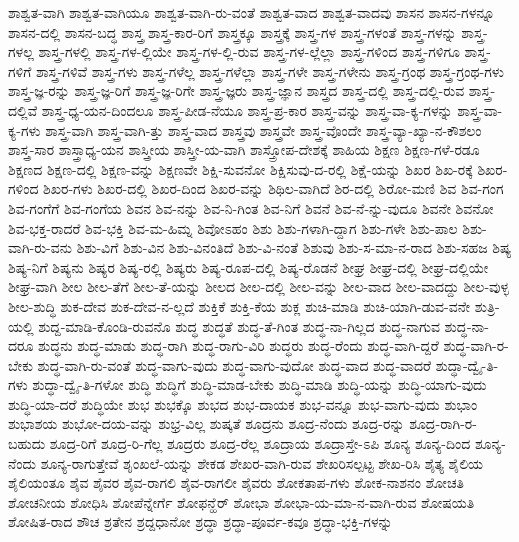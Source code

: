 {ಶಾಶ್ವತ-ವಾಗಿ
ಶಾಶ್ವತ-ವಾಗಿಯೂ
ಶಾಶ್ವತ-ವಾಗಿ-ರು-ವಂತೆ
ಶಾಶ್ವತ-ವಾದ
ಶಾಶ್ವತ-ವಾದವು
ಶಾಸನ
ಶಾಸನ-ಗಳನ್ನೂ
ಶಾಸನ-ದಲ್ಲಿ
ಶಾಸನ-ಬದ್ಧ
ಶಾಸ್ತ್ರ
ಶಾಸ್ತ್ರ-ಕಾರ-ರಿಗೆ
ಶಾಸ್ತ್ರಕ್ಕೂ
ಶಾಸ್ತ್ರಕ್ಕೆ
ಶಾಸ್ತ್ರ-ಗಳ
ಶಾಸ್ತ್ರ-ಗಳಂತೆ
ಶಾಸ್ತ್ರ-ಗಳನ್ನು
ಶಾಸ್ತ್ರ-ಗಳಲ್ಲ
ಶಾಸ್ತ್ರ-ಗಳಲ್ಲಿ
ಶಾಸ್ತ್ರ-ಗಳ-ಲ್ಲಿಯೇ
ಶಾಸ್ತ್ರ-ಗಳ-ಲ್ಲಿ-ರುವ
ಶಾಸ್ತ್ರ-ಗಳ-ಲ್ಲೆಲ್ಲಾ
ಶಾಸ್ತ್ರ-ಗಳಿಂದ
ಶಾಸ್ತ್ರ-ಗಳಿಗೂ
ಶಾಸ್ತ್ರ-ಗಳಿಗೆ
ಶಾಸ್ತ್ರ-ಗಳಿವೆ
ಶಾಸ್ತ್ರ-ಗಳು
ಶಾಸ್ತ್ರ-ಗಳೆಲ್ಲ
ಶಾಸ್ತ್ರ-ಗಳೆಲ್ಲಾ
ಶಾಸ್ತ್ರ-ಗಳೇ
ಶಾಸ್ತ್ರ-ಗಳೇನು
ಶಾಸ್ತ್ರ-ಗ್ರಂಥ
ಶಾಸ್ತ್ರ-ಗ್ರಂಥ-ಗಳು
ಶಾಸ್ತ್ರ-ಜ್ಞ-ರನ್ನು
ಶಾಸ್ತ್ರ-ಜ್ಞ-ರಿಗೆ
ಶಾಸ್ತ್ರ-ಜ್ಞ-ರಿಗೇ
ಶಾಸ್ತ್ರ-ಜ್ಞರು
ಶಾಸ್ತ್ರ-ಜ್ಞಾನ
ಶಾಸ್ತ್ರದ
ಶಾಸ್ತ್ರ-ದಲ್ಲಿ
ಶಾಸ್ತ್ರ-ದಲ್ಲಿ-ರುವ
ಶಾಸ್ತ್ರ-ದಲ್ಲಿವೆ
ಶಾಸ್ತ್ರ-ಧ್ಯ-ಯನ-ದಿಂದಲೂ
ಶಾಸ್ತ್ರ-ಪೀಡ-ನೆಯೂ
ಶಾಸ್ತ್ರ-ಪ್ರ-ಕಾರ
ಶಾಸ್ತ್ರ-ವನ್ನು
ಶಾಸ್ತ್ರ-ವಾ-ಕ್ಯ-ಗಳನ್ನು
ಶಾಸ್ತ್ರ-ವಾ-ಕ್ಯ-ಗಳು
ಶಾಸ್ತ್ರ-ವಾಗಿ
ಶಾಸ್ತ್ರ-ವಾಗಿ-ತ್ತು
ಶಾಸ್ತ್ರ-ವಾದ
ಶಾಸ್ತ್ರವು
ಶಾಸ್ತ್ರವೇ
ಶಾಸ್ತ್ರ-ವೊಂದೇ
ಶಾಸ್ತ್ರ-ವ್ಯಾ-ಖ್ಯಾ-ನ-ಕೌಶಲಂ
ಶಾಸ್ತ್ರ-ಸಾರ
ಶಾಸ್ತ್ರಾಧ್ಯ-ಯನ
ಶಾಸ್ತ್ರೀಯ
ಶಾಸ್ತ್ರೀ-ಯ-ವಾಗಿ
ಶಾಸ್ತ್ರೋಪ-ದೇಶಕ್ಕೆ
ಶಾಹಿಯ
ಶಿಕ್ಷಣ
ಶಿಕ್ಷಣ-ಗಳೆ-ರಡೂ
ಶಿಕ್ಷಣದ
ಶಿಕ್ಷಣ-ದಲ್ಲಿ
ಶಿಕ್ಷಣ-ವನ್ನು
ಶಿಕ್ಷಣವೇ
ಶಿಕ್ಷಿ-ಸುವನೋ
ಶಿಕ್ಷಿಸುವು-ದ-ರಲ್ಲಿ
ಶಿಕ್ಷೆ-ಯನ್ನು
ಶಿಖರ
ಶಿಖ-ರಕ್ಕೆ
ಶಿಖರ-ಗಳಿಂದ
ಶಿಖರ-ಗಳು
ಶಿಖರ-ದಲ್ಲಿ
ಶಿಖರ-ದಿಂದ
ಶಿಖರ-ವನ್ನು
ಶಿಥಿಲ-ವಾಗಿದೆ
ಶಿರ-ದಲ್ಲಿ
ಶಿರೋ-ಮಣಿ
ಶಿವ
ಶಿವ-ಗಂಗ
ಶಿವ-ಗಂಗೆಗೆ
ಶಿವ-ಗಂಗೆಯ
ಶಿವನ
ಶಿವ-ನನ್ನು
ಶಿವ-ನಿ-ಗಿಂತ
ಶಿವ-ನಿಗೆ
ಶಿವನೆ
ಶಿವ-ನೆ-ನ್ನು-ವುದೂ
ಶಿವನೇ
ಶಿವನೋ
ಶಿವ-ಭಕ್ತ-ರಾದರೆ
ಶಿವ-ಭಕ್ತಿ
ಶಿವ-ಮ-ಹಿಮ್ನ
ಶಿವೋಽಹಂ
ಶಿಶು
ಶಿಶು-ಗಳಾಗಿ-ದ್ದಾಗ
ಶಿಶು-ಗಳೇ
ಶಿಶು-ಪಾಲ
ಶಿಶು-ವಾಗಿ-ರು-ವನು
ಶಿಶು-ವಿಗೆ
ಶಿಶು-ವಿನ
ಶಿಶು-ವಿನಂತಿದೆ
ಶಿಶು-ವಿ-ನಂತೆ
ಶಿಶುವು
ಶಿಶು-ಸ-ಮಾ-ನ-ರಾದ
ಶಿಶು-ಸಹಜ
ಶಿಷ್ಯ
ಶಿಷ್ಯ-ನಿಗೆ
ಶಿಷ್ಯನು
ಶಿಷ್ಯರ
ಶಿಷ್ಯ-ರಲ್ಲಿ
ಶಿಷ್ಯರು
ಶಿಷ್ಯ-ರೂಪ-ದಲ್ಲಿ
ಶಿಷ್ಯ-ರೊಡನೆ
ಶೀಘ್ರ
ಶೀಘ್ರ-ದಲ್ಲಿ
ಶೀಘ್ರ-ದಲ್ಲಿಯೇ
ಶೀಘ್ರ-ವಾಗಿ
ಶೀಲ
ಶೀಲ-ತೆಗೆ
ಶೀಲ-ತೆ-ಯನ್ನು
ಶೀಲದ
ಶೀಲ-ದಲ್ಲಿ
ಶೀಲ-ವನ್ನು
ಶೀಲ-ವಾದ
ಶೀಲ-ವಾದದ್ದು
ಶೀಲ-ವುಳ್ಳ
ಶೀಲ-ಶುದ್ಧಿ
ಶುಕ-ದೇವ
ಶುಕ-ದೇವ-ನ-ಲ್ಲದೆ
ಶುಕ್ತಿಕೆ
ಶುಕ್ತಿ-ಕೆಯ
ಶುಕ್ಲ
ಶುಚಿ-ಮಾಡಿ
ಶುಚಿ-ಯಾಗಿ-ಡುವ-ವನೇ
ಶುತ್ರಿ-ಯಲ್ಲಿ
ಶುದ್ದ-ಮಾಡಿ-ಕೊಂಡಿ-ರುವನೊ
ಶುದ್ಧ
ಶುದ್ಧತೆ
ಶುದ್ಧ-ತೆ-ಗಿಂತ
ಶುದ್ಧ-ನಾ-ಗಿಲ್ಲದ
ಶುದ್ಧ-ನಾಗುವ
ಶುದ್ಧ-ನಾ-ದರೂ
ಶುದ್ಧನು
ಶುದ್ಧ-ಮಾಡು
ಶುದ್ಧ-ರಾಗಿ
ಶುದ್ಧ-ರಾಗು-ವಿರಿ
ಶುದ್ಧರು
ಶುದ್ಧ-ರೆಂದು
ಶುದ್ಧ-ವಾಗಿ-ದ್ದರೆ
ಶುದ್ಧ-ವಾಗಿ-ರ-ಬೇಕು
ಶುದ್ಧ-ವಾಗಿ-ರು-ವಂತೆ
ಶುದ್ಧ-ವಾಗು-ವುದು
ಶುದ್ಧ-ವಾಗು-ವುದೋ
ಶುದ್ಧ-ವಾದ
ಶುದ್ಧ-ವಾದರೆ
ಶುದ್ಧಾ-ದ್ವೈ-ತಿ-ಗಳು
ಶುದ್ಧಾ-ದ್ವೈ-ತಿ-ಗಳೋ
ಶುದ್ಧಿ
ಶುದ್ಧಿಗೆ
ಶುದ್ಧಿ-ಮಾಡ-ಬೇಕು
ಶುದ್ಧಿ-ಮಾಡಿ
ಶುದ್ಧಿ-ಯನ್ನು
ಶುದ್ಧಿ-ಯಾಗು-ವುದು
ಶುದ್ಧಿ-ಯಾ-ದರೆ
ಶುದ್ಧಿಯೇ
ಶುಭ
ಶುಭಕ್ಕೊ
ಶುಭದ
ಶುಭ-ದಾಯಕ
ಶುಭ-ವನ್ನೂ
ಶುಭ-ವಾಗು-ವುದು
ಶುಭಾಂ
ಶುಭಾಶಯ
ಶುಭೋ-ದಯ-ವನ್ನು
ಶುಭ್ರ-ವಿಲ್ಲ
ಶುಷ್ಕತೆ
ಶೂದ್ರನು
ಶೂದ್ರ-ನೆಂದು
ಶೂದ್ರ-ರನ್ನು
ಶೂದ್ರ-ರಾಗಿ-ರ-ಬಹುದು
ಶೂದ್ರ-ರಿಗೆ
ಶೂದ್ರ-ರಿ-ಗೆಲ್ಲ
ಶೂದ್ರರು
ಶೂದ್ರ-ರೆಲ್ಲ
ಶೂದ್ರಾಯ
ಶೂದ್ರಾಸ್ತೇ-ಽಪಿ
ಶೂನ್ಯ
ಶೂನ್ಯ-ದಿಂದ
ಶೂನ್ಯ-ನೆಂದು
ಶೂನ್ಯ-ರಾಗುತ್ತೇವೆ
ಶೃಂಖಲೆ-ಯನ್ನು
ಶೇಕಡ
ಶೇಖರ-ವಾಗಿ-ರುವ
ಶೇಖರಿಸಲ್ಪಟ್ಟ
ಶೇಖ-ರಿಸಿ
ಶೈತ್ಯ
ಶೈಲಿಯ
ಶೈಲಿಯಂತೂ
ಶೈವ
ಶೈವರ
ಶೈವ-ರಾಗಲಿ
ಶೈವ-ರಾಗಲೀ
ಶೈವರು
ಶೋಕತಾಪ-ಗಳು
ಶೋಕ-ನಾಶನಂ
ಶೋಚತಿ
ಶೋಚನೀಯ
ಶೋಧಿಸಿ
ಶೋಪೆನ್ನೇರ್ಗೆ
ಶೋಫನ್ಹೆರ್
ಶೋಭಾ
ಶೋಭಾ-ಯ-ಮಾ-ನ-ವಾಗಿ-ರುವ
ಶೋಷಯತಿ
ಶೋಷಿತ-ರಾದ
ಶೌಚ
ಶ್ರತೇನ
ಶ್ರದ್ದಧಾನೋ
ಶ್ರದ್ಧಾ
ಶ್ರದ್ಧಾ-ಪೂರ್ವ-ಕವೂ
ಶ್ರದ್ಧಾ-ಭಕ್ತಿ-ಗಳನ್ನು
}

